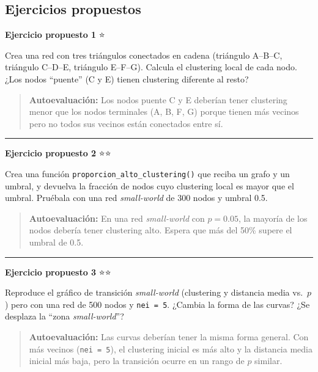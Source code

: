 \documentclass[
  letterpaper,
  DIV=11,
  numbers=noendperiod]{scrreprt}
\begin{document}
\subsection*{Ejercicios propuestos}\label{ejercicios-propuestos-3}

\textbf{Ejercicio propuesto 1} ⭐

Crea una red con tres triángulos conectados en cadena (triángulo
A--B--C, triángulo C--D--E, triángulo E--F--G). Calcula el clustering
local de cada nodo. ¿Los nodos ``puente'' (C y E) tienen clustering
diferente al resto?

\begin{quote}
\textbf{Autoevaluación:} Los nodos puente C y E deberían tener
clustering menor que los nodos terminales (A, B, F, G) porque tienen más
vecinos pero no todos sus vecinos están conectados entre sí.
\end{quote}

\begin{center}\rule{0.5\linewidth}{0.5pt}\end{center}

\textbf{Ejercicio propuesto 2} ⭐⭐

Crea una función \texttt{proporcion\_alto\_clustering()} que reciba un
grafo y un umbral, y devuelva la fracción de nodos cuyo clustering local
es mayor que el umbral. Pruébala con una red \emph{small-world} de 300
nodos y umbral 0.5.

\begin{quote}
\textbf{Autoevaluación:} En una red \emph{small-world} con \(p = 0.05\),
la mayoría de los nodos debería tener clustering alto. Espera que más
del 50\% supere el umbral de 0.5.
\end{quote}

\begin{center}\rule{0.5\linewidth}{0.5pt}\end{center}

\textbf{Ejercicio propuesto 3} ⭐⭐

Reproduce el gráfico de transición \emph{small-world} (clustering y
distancia media vs.~\(p\)) pero con una red de 500 nodos y
\texttt{nei\ =\ 5}. ¿Cambia la forma de las curvas? ¿Se desplaza la
``zona \emph{small-world}''?

\begin{quote}
\textbf{Autoevaluación:} Las curvas deberían tener la misma forma
general. Con más vecinos (\texttt{nei\ =\ 5}), el clustering inicial es
más alto y la distancia media inicial más baja, pero la transición
ocurre en un rango de \(p\) similar.
\end{quote}
\end{document}
